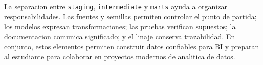 \documentclass[12pt]{article}
\begin{document}
La separacion entre \texttt{staging}, \texttt{intermediate} y \texttt{marts} ayuda a organizar responsabilidades. Las fuentes y semillas permiten controlar el punto de partida; los modelos expresan transformaciones; las pruebas verifican supuestos; la documentacion comunica significado; y el linaje conserva trazabilidad. En conjunto, estos elementos permiten construir datos confiables para BI y preparan al estudiante para colaborar en proyectos modernos de analitica de datos.

\printbibliography
\end{document}
